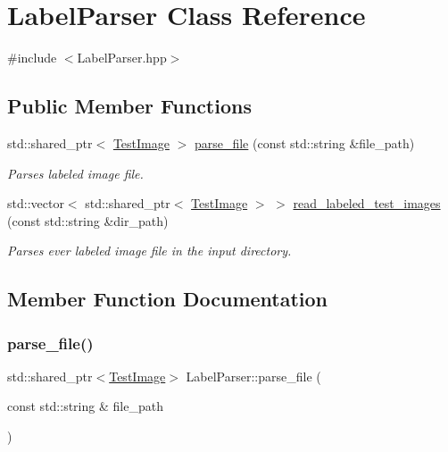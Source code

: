\hypertarget{class_label_parser}{}\section{Label\+Parser Class Reference}
\label{class_label_parser}


{\ttfamily \#include $<$Label\+Parser.\+hpp$>$}

\subsection*{Public Member Functions}
\begin{DoxyCompactItemize}
\item 
std\+::shared\+\_\+ptr$<$ \hyperlink{struct_test_image}{Test\+Image} $>$ \hyperlink{class_label_parser_ac524e2136bcf06560e53fadf0c7eb9ad}{parse\+\_\+file} (const std\+::string \&file\+\_\+path)
\begin{DoxyCompactList}\small\item\em Parses labeled image file. \end{DoxyCompactList}\item 
std\+::vector$<$ std\+::shared\+\_\+ptr$<$ \hyperlink{struct_test_image}{Test\+Image} $>$ $>$ \hyperlink{class_label_parser_a2de825ad0f48b9e5b8b3a27c2cf697a7}{read\+\_\+labeled\+\_\+test\+\_\+images} (const std\+::string \&dir\+\_\+path)
\begin{DoxyCompactList}\small\item\em Parses ever labeled image file in the input directory. \end{DoxyCompactList}\end{DoxyCompactItemize}


\subsection{Member Function Documentation}
\mbox{\label{class_label_parser_ac524e2136bcf06560e53fadf0c7eb9ad}} 
\subsubsection{\texorpdfstring{parse\+\_\+file()}{parse\_file()}}
{\footnotesize\ttfamily std\+::shared\+\_\+ptr$<$\hyperlink{struct_test_image}{Test\+Image}$>$ Label\+Parser\+::parse\+\_\+file (\begin{DoxyParamCaption}\item[{const std\+::string \&}]{file\+\_\+path }\end{DoxyParamCaption})}



